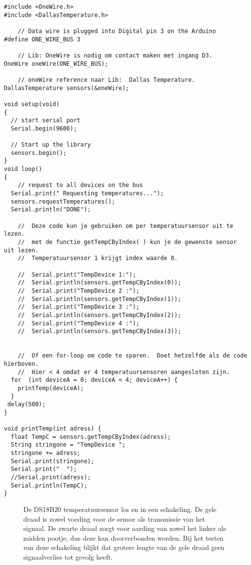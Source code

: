 \begin{verbatim}
#include <OneWire.h>
#include <DallasTemperature.h>
 
    // Data wire is plugged into Digital pin 3 on the Arduino
#define ONE_WIRE_BUS 3
 
    // Lib: OneWire is nodig om contact maken met ingang D3. 
OneWire oneWire(ONE_WIRE_BUS);
 
    // oneWire reference naar Lib:  Dallas Temperature.
DallasTemperature sensors(&oneWire);
 
void setup(void)
{
  // start serial port
  Serial.begin(9600);
  
  // Start up the library
  sensors.begin();  
}
void loop()
{ 
    // request to all devices on the bus
  Serial.print(" Requesting temperatures...");
  sensors.requestTemperatures(); 
  Serial.println("DONE");
  
    //  Deze code kun je gebruiken om per temperatuursensor uit te lezen.
    //  met de functie getTempCByIndex( ) kun je de gewenste sensor uit lezen.
    //  Temperatuursensor 1 krijgt index waarde 0.    

    //  Serial.print("TempDevice 1:");
    //  Serial.println(sensors.getTempCByIndex(0)); 
    //  Serial.print("TempDevice 2 :");
    //  Serial.println(sensors.getTempCByIndex(1));
    //  Serial.print("TempDevice 3 :");
    //  Serial.println(sensors.getTempCByIndex(2));
    //  Serial.print("TempDevice 4 :");
    //  Serial.println(sensors.getTempCByIndex(3));  


    //  Of een for-loop om code te sparen.  Doet hetzelfde als de code hierboven. 
    //  Hier < 4 omdat er 4 temperatuursensoren aangesloten zijn.
  for  (int deviceA = 0; deviceA < 4; deviceA++) {
    printTemp(deviceA);
  }
 delay(500);
}

void printTemp(int adress) {  
  float TempC = sensors.getTempCByIndex(adress);
  String stringone = "TempDevice ";
  stringone += adress;
  Serial.print(stringone);
  Serial.print("  ");
  //Serial.print(adress);
  Serial.println(TempC);  
}
\end{verbatim}


\begin{figure}
    \centering
    \subfloat[]{
        \texttt{[image: DS18B20\_A\_2]}
        \label{fig:DS18B20_A_2}}
    \hfill
    \caption{De DS18B20 temperatuursensor los en in een schakeling. De gele draad 
    is zowel voeding voor de sensor als transmissie van het signaal. De zwarte 
    draad zorgt voor aarding van zowel het linker als midden pootje, dus deze 
    kan doorverbonden worden.
    Bij het testen van deze schakeling blijkt dat grotere lengte van de gele draad 
    geen signaalverlies tot gevolg heeft.}
\end{figure}

